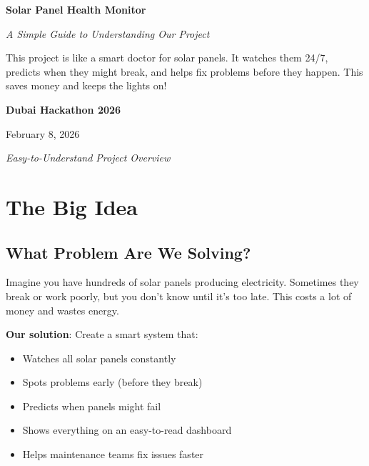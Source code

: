 \documentclass[12pt,a4paper]{article}
\begin{document}
\begin{titlepage}
    \centering
    \vspace*{2cm}
    
    {\Huge\bfseries Solar Panel Health Monitor\par}
    \vspace{1cm}
    {\Large\itshape A Simple Guide to Understanding Our Project\par}
    \vspace{2cm}
    
    \begin{tcolorbox}[colback=easygreen!10!white,colframe=easygreen!75!black,title=What Does This Project Do?]
    \large
    This project is like a smart doctor for solar panels. It watches them 24/7, predicts when they might break, and helps fix problems before they happen. This saves money and keeps the lights on!
    \end{tcolorbox}
    
    \vspace{2cm}
    
    {\Large\textbf{Dubai Hackathon 2026}\par}
    \vspace{0.5cm}
    {\large February 8, 2026\par}
    
    \vfill
    
    {\large\textit{Easy-to-Understand Project Overview}\par}
\end{titlepage}

\tableofcontents
\newpage

\section{The Big Idea}

\subsection{What Problem Are We Solving?}

Imagine you have hundreds of solar panels producing electricity. Sometimes they break or work poorly, but you don't know until it's too late. This costs a lot of money and wastes energy.

\textbf{Our solution}: Create a smart system that:
\begin{itemize}[leftmargin=*]
    \item Watches all solar panels constantly
    \item Spots problems early (before they break)
    \item Predicts when panels might fail
    \item Shows everything on an easy-to-read dashboard
    \item Helps maintenance teams fix issues faster
\end{itemize}
\end{document}
